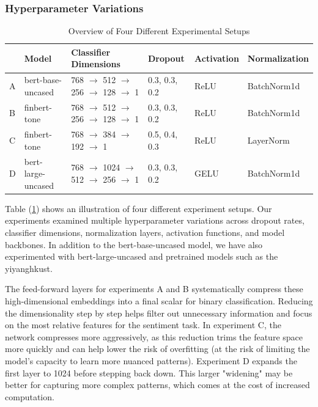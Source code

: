 \documentclass[12pt]{article}
\begin{document}
\subsubsection*{Hyperparameter Variations}

\begin{table}[ht]
	\centering
	\begin{tabular}{@{} l l l l l l @{}}
		\toprule
		\textbf{} & \textbf{Model} & \textbf{Classifier Dimensions} & \textbf{Dropout} & \textbf{Activation} & \textbf{Normalization} \\
		\midrule
		A & bert-base-uncased & 768 $\rightarrow$ 512 $\rightarrow$ 256 $\rightarrow$ 128 $\rightarrow$ 1 & 0.3, 0.3, 0.2 & ReLU & BatchNorm1d \\
		B & finbert-tone      & 768 $\rightarrow$ 512 $\rightarrow$ 256 $\rightarrow$ 128 $\rightarrow$ 1 & 0.3, 0.3, 0.2 & ReLU & BatchNorm1d \\
		C & finbert-tone      & 768 $\rightarrow$ 384 $\rightarrow$ 192 $\rightarrow$ 1                    & 0.5, 0.4, 0.3 & ReLU & LayerNorm \\
		D & bert-large-uncased & 768 $\rightarrow$ 1024 $\rightarrow$ 512 $\rightarrow$ 256 $\rightarrow$ 1 & 0.3, 0.3, 0.2 & GELU & BatchNorm1d \\
		\bottomrule
	\end{tabular}
	\caption{Overview of Four Different Experimental Setups}
	\label{tab:experiments}
\end{table}

Table (\ref{tab:experiments}) shows an illustration of four different experiment setups. Our experiments examined multiple hyperparameter variations across dropout rates, classifier dimensions, normalization layers, activation functions, and model backbones. In addition to the bert-base-uncased model, we have also experimented with bert-large-uncased and pretrained models such as the yiyanghkust.

The feed-forward layers for experiments A and B systematically compress these high-dimensional embeddings into a final scalar for binary classification. Reducing the dimensionality step by step helps filter out unnecessary information and focus on the most relative features for the sentiment task. In experiment C, the network compresses more aggressively, as this reduction trims the feature space more quickly and can help lower the risk of overfitting (at the risk of limiting the model's capacity to learn more nuanced patterns). Experiment D expands the first layer to 1024 before stepping back down. This larger "widening" may be better for capturing more complex patterns, which comes at the cost of increased computation.
\end{document}
